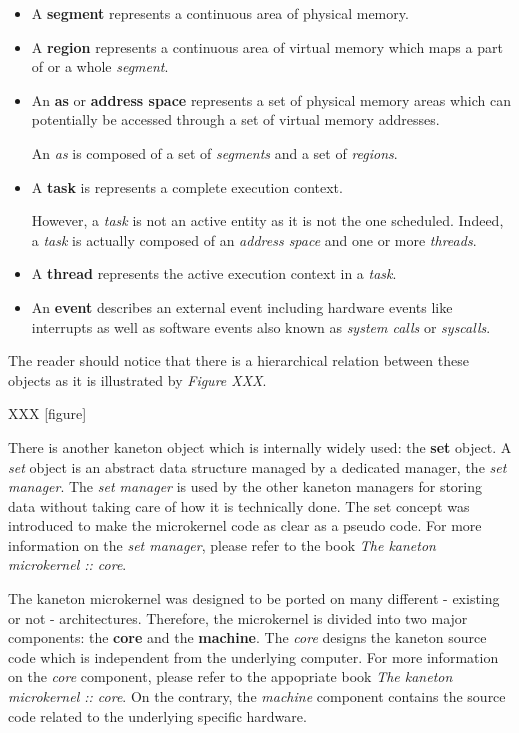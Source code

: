 \begin{itemize}
  \item
    A \textbf{segment} represents a continuous area of physical memory.
  \item
    A \textbf{region} represents a continuous area of virtual memory which
    maps a part of or a whole \textit{segment}.
  \item
    An \textbf{as} or \textbf{address space} represents a set of physical
    memory areas which can potentially be accessed through a set of virtual
    memory addresses.

    \-

    An \textit{as} is composed of a set of \textit{segments} and a set of
    \textit{regions}.
  \item
    A \textbf{task} is represents a complete execution context.

    \-

    However, a \textit{task} is not an active entity as it is not the
    one scheduled. Indeed, a \textit{task} is actually composed of an
    \textit{address space} and one or more \textit{threads}.
  \item
    A \textbf{thread} represents the active execution context in a
    \textit{task}.
  \item
    An \textbf{event} describes an external event including hardware
    events like interrupts as well as software events also known as
    \textit{system calls} or \textit{syscalls}.
\end{itemize}

The reader should notice that there is a hierarchical relation between
these objects as it is illustrated by \textit{Figure XXX}.

XXX [figure]

There is another kaneton object which is internally widely used: the
\textbf{set} object. A \textit{set} object is an abstract data structure
managed by a dedicated manager, the \textit{set manager}. The \textit{set
manager} is used by the other kaneton managers for storing data without taking
care of how it is technically done. The set concept was introduced to make the
microkernel code as clear as a pseudo code. For more information on the
\textit{set manager}, please refer to the book \textit{The kaneton
microkernel :: core}.

The kaneton microkernel was designed to be ported on many different - existing
or not - architectures. Therefore, the microkernel is divided into two
major components: the \textbf{core} and the \textbf{machine}. The \textit{core}
designs the kaneton source code which is independent from the underlying
computer. For more information on the \textit{core} component, please refer
to the appopriate book \textit{The kaneton microkernel :: core}. On the
contrary, the \textit{machine} component contains the source code related to
the underlying specific hardware.

